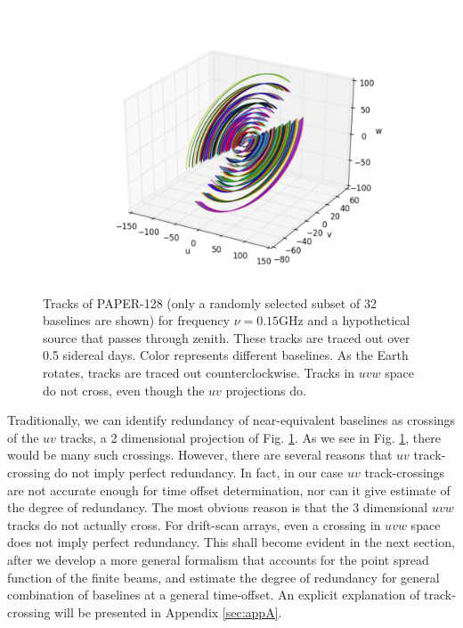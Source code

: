 \documentclass[twocolumn,apj,numberedappendix]{emulateapj}
\renewcommand\[{\begin{equation}}
\renewcommand\]{\end{equation}}
\begin{document}
\begin{figure}[H]
\includegraphics[width=\linewidth]{tracks3D}
\caption{Tracks of PAPER-128 (only a randomly selected subset of 32 baselines are shown) for frequency $\nu=0.15\text{GHz}$ and a hypothetical source that passes through zenith.
These tracks are traced out over 0.5 sidereal days. Color represents different baselines. 
As the Earth rotates, tracks are traced out counterclockwise. Tracks in $uvw$ space do not cross, even though the $uv$ projections do. }
\label{fig:Tracks}
\end{figure}

Traditionally, we can identify
redundancy of near-equivalent baselines as crossings
of the $uv$ tracks, a 2 dimensional projection of Fig. \ref{fig:Tracks}. As we see in Fig. \ref{fig:Tracks}, there would be many such crossings. However, there are several reasons that $uv$ track-crossing do not imply perfect redundancy. In fact, in our case $uv$ track-crossings are
not accurate enough for time offset determination, nor can it give estimate of the degree of redundancy.  The most obvious reason is that the 3 dimensional $uvw$ tracks do not actually cross. For drift-scan arrays, even a crossing in $uvw$ space does not imply perfect redundancy. This shall become evident in the next section, after we develop a more general formalism that accounts for the point spread function of the finite beams, and estimate the degree of redundancy for general combination of baselines at a general time-offset. An explicit explanation of track-crossing will be presented in Appendix \ref{sec:appA}. 
\end{document}
